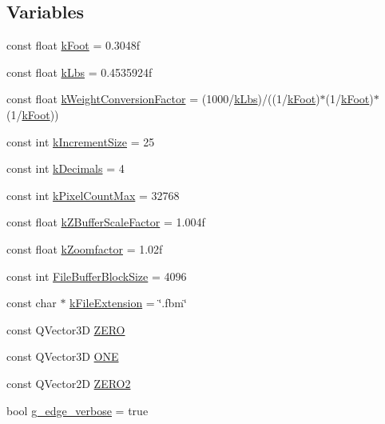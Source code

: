 \subsection*{Variables}
\begin{DoxyCompactItemize}
\item 
const float \hyperlink{namespaceShipCAD_a8c1484188fed1e735c5a94f64a6817ab}{k\-Foot} = 0.\-3048f
\item 
const float \hyperlink{namespaceShipCAD_ad6937518d9742e268b279000d1e7a509}{k\-Lbs} = 0.\-4535924f
\item 
const float \hyperlink{namespaceShipCAD_aa4319c8e7adfa68048f95c1614984036}{k\-Weight\-Conversion\-Factor} = (1000/\hyperlink{namespaceShipCAD_ad6937518d9742e268b279000d1e7a509}{k\-Lbs})/((1/\hyperlink{namespaceShipCAD_a8c1484188fed1e735c5a94f64a6817ab}{k\-Foot})$\ast$(1/\hyperlink{namespaceShipCAD_a8c1484188fed1e735c5a94f64a6817ab}{k\-Foot})$\ast$(1/\hyperlink{namespaceShipCAD_a8c1484188fed1e735c5a94f64a6817ab}{k\-Foot}))
\item 
const int \hyperlink{namespaceShipCAD_a1c0de7dc4306d7908bd8c6f7ff69ecdc}{k\-Increment\-Size} = 25
\item 
const int \hyperlink{namespaceShipCAD_ac88ffd27e117a3e612997a36a5d4616d}{k\-Decimals} = 4
\item 
const int \hyperlink{namespaceShipCAD_ac8176e9d12f859826fb131b7febb8c8a}{k\-Pixel\-Count\-Max} = 32768
\item 
const float \hyperlink{namespaceShipCAD_a519c591e5f5e3f60603b3133a4a2094e}{k\-Z\-Buffer\-Scale\-Factor} = 1.\-004f
\item 
const float \hyperlink{namespaceShipCAD_a80babe3fef93f1117e1c410f8d3c22c2}{k\-Zoomfactor} = 1.\-02f
\item 
const int \hyperlink{namespaceShipCAD_afeba968c9abef53c8d1ff63855076dec}{File\-Buffer\-Block\-Size} = 4096
\item 
const char $\ast$ \hyperlink{namespaceShipCAD_a6461e4d91e555f0c732b53f8998b325d}{k\-File\-Extension} = \char`\"{}.fbm\char`\"{}
\item 
const Q\-Vector3\-D \hyperlink{namespaceShipCAD_a949bc53a1634b268b43de672807480fb}{Z\-E\-R\-O}
\item 
const Q\-Vector3\-D \hyperlink{namespaceShipCAD_ad454d484187a50b115d2e77055617816}{O\-N\-E}
\item 
const Q\-Vector2\-D \hyperlink{namespaceShipCAD_ab47218dccdf4c94d5989b2e5b13d8603}{Z\-E\-R\-O2}
\item 
bool \hyperlink{namespaceShipCAD_ad5a157bd082e37a863f05b7c54a1d7cc}{g\-\_\-edge\-\_\-verbose} = true

\end{DoxyCompactItemize}
